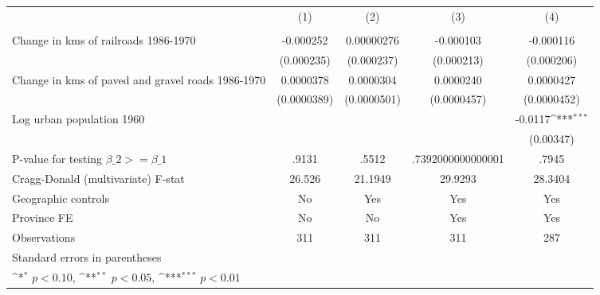 {
\def\sym#1{\ifmmode^{#1}\else\(^{#1}\)\fi}
\begin{tabular}{l*{4}{c}}
\hline\hline
                &\multicolumn{1}{c}{(1)}&\multicolumn{1}{c}{(2)}&\multicolumn{1}{c}{(3)}&\multicolumn{1}{c}{(4)}\\
                &\multicolumn{1}{c}{}&\multicolumn{1}{c}{}&\multicolumn{1}{c}{}&\multicolumn{1}{c}{}\\
\hline
Change in kms of railroads 1986-1970&-0.000252         &0.00000276         &-0.000103         &-0.000116         \\
                &(0.000235)         &(0.000237)         &(0.000213)         &(0.000206)         \\
[1em]
Change in kms of paved and gravel roads 1986-1970&0.0000378         &0.0000304         &0.0000240         &0.0000427         \\
                &(0.0000389)         &(0.0000501)         &(0.0000457)         &(0.0000452)         \\
[1em]
Log urban population 1960&                  &                  &                  &  -0.0117\sym{***}\\
                &                  &                  &                  &(0.00347)         \\
\hline
P-value for testing $\beta\_{2} >= \beta\_{1}$&    .9131         &    .5512         &.7392000000000001         &    .7945         \\
Cragg-Donald (multivariate) F-stat&   26.526         &  21.1949         &  29.9293         &  28.3404         \\
Geographic controls&       No         &      Yes         &      Yes         &      Yes         \\
Province FE     &       No         &       No         &      Yes         &      Yes         \\
Observations    &      311         &      311         &      311         &      287         \\
\hline\hline
\multicolumn{5}{l}{\footnotesize Standard errors in parentheses}\\
\multicolumn{5}{l}{\footnotesize \sym{*} \(p<0.10\), \sym{**} \(p<0.05\), \sym{***} \(p<0.01\)}\\
\end{tabular}
}
